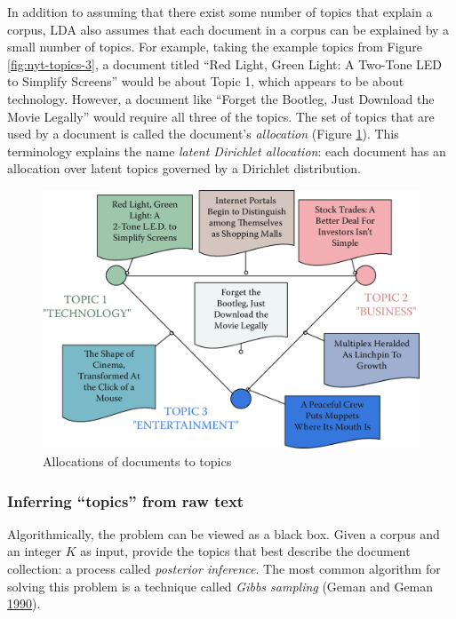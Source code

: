 \documentclass[]{krantz}
\begin{document}
In addition to assuming that there exist some number of topics that
explain a corpus, LDA also assumes that each document in a corpus can be
explained by a small number of topics. For example, taking the example
topics from Figure \ref{fig:nyt-topics-3}, a document titled ``Red
Light, Green Light: A Two-Tone LED to Simplify Screens'' would be about
Topic 1, which appears to be about technology. However, a document like
``Forget the Bootleg, Just Download the Movie Legally'' would require
all three of the topics. The set of topics that are used by a document
is called the document's \emph{allocation} (Figure
\ref{fig:nyt-documents}). This terminology explains the name
\emph{latent Dirichlet allocation}: each document has an allocation over
latent topics governed by a Dirichlet distribution.

\begin{figure}

{\centering \includegraphics[width=0.7\linewidth]{ChapterText/figures/nyt_documents} 

}

\caption{Allocations of documents to topics}\label{fig:nyt-documents}
\end{figure}

\subsubsection{\texorpdfstring{Inferring ``topics'' from raw
text}{Inferring topics from raw text}}\label{inferring-topics-from-raw-text}

Algorithmically, the problem can be viewed as a black box. Given a
corpus and an integer \(K\) as input, provide the topics that best
describe the document collection: a process called \emph{posterior
inference}. The most common algorithm for solving this problem is a
technique called \emph{Gibbs sampling} (Geman and Geman
\protect\hyperlink{ref-geman-90}{1990}).
\end{document}
